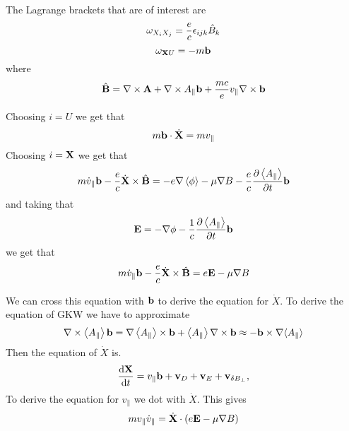 The Lagrange brackets that are of interest are
\begin{equation}
\omega_{X_{i}X_{j}}={e\over c}\epsilon_{ijk}{\hat B}_{k}
\end{equation}
\begin{equation}
\omega_{{\bf X}U}=-m{\bf b}
\end{equation}
where 
\begin{equation}
{\hat {\bf B}}=\nabla \times {\bf A}+\nabla \times A_{\parallel}{\bf b}+{mc \over e}v_{\parallel}\nabla \times {\bf b}
\end{equation}

Choosing $i=U$ we get that
\begin{equation}
m{\bf b}\cdot {\dot {\bf X}}=mv_{\parallel}
\end{equation}
Choosing $i={\bf X}$ we get that
\begin{equation}
m{\dot v}_{\parallel}{\bf b}-{e\over c}{\dot {\bf X}}\times {\hat{\bf B}}=-e\nabla \left\langle \phi\right\rangle-\mu \nabla B-{e\over c}
{\partial \left\langle A_{\parallel}\right\rangle\over \partial t}{\bf b}
\end{equation}
and taking that
\begin{equation}
{\bf E}=-\nabla \phi -{1\over c}{\partial \left\langle A_{\parallel}\right\rangle\over \partial t}{\bf b}
\end{equation}
we get that
\begin{equation}
m{\dot v}_{\parallel}{\bf b}-{e\over c}{\dot {\bf X}}\times {\hat{\bf B}}=e{\bf E}-\mu \nabla B
\end{equation}

We can cross this equation with ${\bf b}$ to derive the equation for $\dot X$. To derive the equation of GKW we have
to approximate
\begin{equation}
\nabla \times \left\langle  A_\parallel\right\rangle {\bf b}
= 
\nabla \left\langle A_\parallel\right\rangle\times\mathbf{b} + \left\langle A_\parallel\right\rangle\nabla\times\mathbf{b}
 \approx - {\bf b} \times \nabla \langle A_\parallel \rangle 
\label{eq:approxtofindExBdrift}
\end{equation}
Then the equation of $\dot X$ is.
\begin{equation} 
{{\rm d} {\bf X} \over {\rm d} t} = v_\parallel {\bf b} + {\bf v}_D + {\bf v}_E + {\bf v}_{\delta B_\perp}, 
\end{equation}
To derive the equation for $v_{\parallel}$ we dot with $\dot X$. This gives
\begin{equation}
mv_{\parallel}{\dot v}_{\parallel}={\dot {\bf X}}\cdot \left(e{\bf E}-\mu \nabla B\right)
\end{equation}

